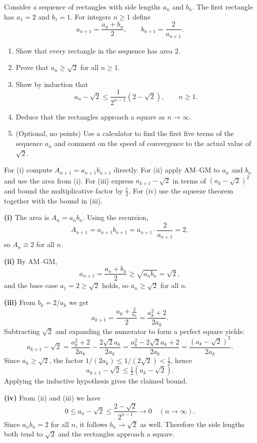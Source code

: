 
\begin{problem}
Consider a sequence of rectangles with side lengths $a_n$ and $b_n$. The first rectangle has $a_1=2$ and $b_1=1$. For integers $n\ge1$ define
\[
a_{n+1}=\frac{a_n+b_n}{2},\qquad b_{n+1}=\frac{2}{a_{n+1}}.
\]

\begin{enumerate}[label=(\roman*)]
    \item Show that every rectangle in the sequence has area $2$.
    \item Prove that $a_n\ge\sqrt{2}$ for all $n\ge1$.
    \item Show by induction that
    \[a_n-\sqrt{2}\le\frac{1}{2^{n-1}}(2-\sqrt{2}),\qquad n\ge1.
    \]
    \item Deduce that the rectangles approach a square as $n\to\infty$.
    \item (Optional, no points) Use a calculator to find the first five terms of the sequence $a_n$ and comment on the speed of convergence to the actual value of $\sqrt{2}$.
\end{enumerate}
\end{problem}

\begin{hint}
For (i) compute $A_{n+1}=a_{n+1}b_{n+1}$ directly. For (ii) apply AM--GM to $a_n$ and $b_n$ and use the area from (i). For (iii) express $a_{k+1}-\sqrt2$ in terms of $(a_k-\sqrt2)^2$ and bound the multiplicative factor by $\tfrac12$. For (iv) use the squeeze theorem together with the bound in (iii).
\end{hint}

\begin{solution}
	\textbf{(i)} The area is $A_n=a_n b_n$. Using the recursion,
\[A_{n+1}=a_{n+1}b_{n+1}=a_{n+1}\cdot\frac{2}{a_{n+1}}=2,
\]
so $A_n\equiv2$ for all $n$.

	\textbf{(ii)} By AM--GM,
\[a_{n+1}=\frac{a_n+b_n}{2}\ge\sqrt{a_n b_n}=\sqrt{2},\]
and the base case $a_1=2\ge\sqrt2$ holds, so $a_n\ge\sqrt2$ for all $n$.

	\textbf{(iii)} From $b_k=2/a_k$ we get
\[a_{k+1}=\frac{a_k+\frac{2}{a_k}}{2}=\frac{a_k^2+2}{2a_k}.
\]
Subtracting $\sqrt2$ and expanding the numerator to form a perfect square yields:
\[a_{k+1}-\sqrt2 = \frac{a_k^2+2}{2a_k} - \frac{2\sqrt{2}a_k}{2a_k} = \frac{a_k^2 - 2\sqrt{2}a_k + 2}{2a_k} = \frac{(a_k-\sqrt2)^2}{2a_k}.
\]
Since $a_k\ge\sqrt2$, the factor $1/(2a_k)\le 1/(2\sqrt2)<\tfrac12$, hence
\[a_{k+1}-\sqrt2\le \tfrac12 (a_k-\sqrt2).
\]
Applying the inductive hypothesis gives the claimed bound.

	\textbf{(iv)} From (ii) and (iii) we have
\[0\le a_n-\sqrt2\le\frac{2-\sqrt2}{2^{n-1}}\to0\quad(n\to\infty).
\]
Since $a_n b_n=2$ for all $n$, it follows $b_n\to\sqrt2$ as well. Therefore the side lengths both tend to $\sqrt2$ and the rectangles approach a square.
\end{solution}


